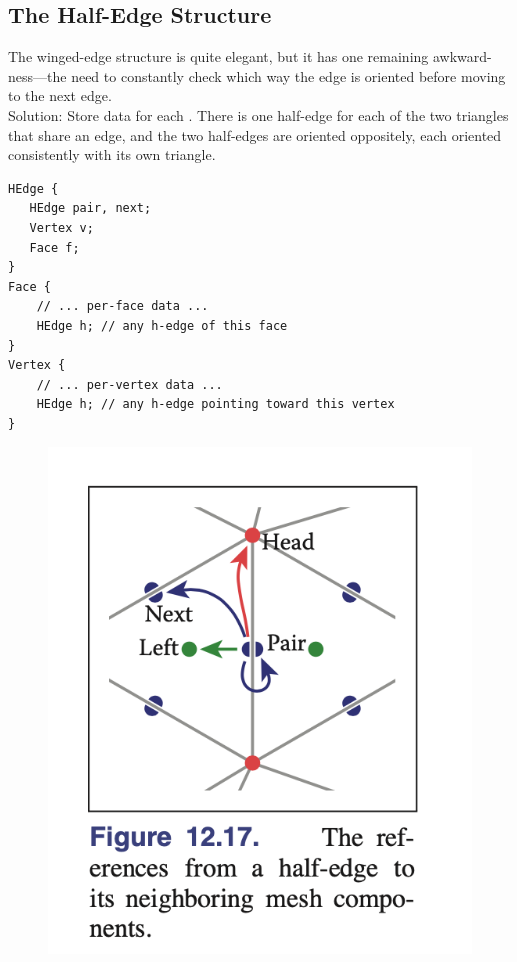 \documentclass[11pt]{article}
\numberwithin{equation}{section}
\begin{document}
\subsection{The Half-Edge Structure}
The winged-edge structure is quite elegant, but it has one remaining awkward- ness—the need to constantly check which way the edge is oriented before moving to the next edge. \\
Solution: Store data for each . There is one half-edge for each of the two triangles that share an edge, and the two half-edges are oriented oppositely, each oriented consistently with its own triangle.\\
\begin{framed}
\begin{verbatim}
HEdge {
   HEdge pair, next;
   Vertex v;
   Face f;
}
Face {
	// ... per-face data ...
	HEdge h; // any h-edge of this face
}
Vertex {
	// ... per-vertex data ...
	HEdge h; // any h-edge pointing toward this vertex
}

\end{verbatim}
\end{framed}
\begin{figure}[H]
	\centering
	\includegraphics[scale=0.5]{p24}
\end{figure}
\end{document}
